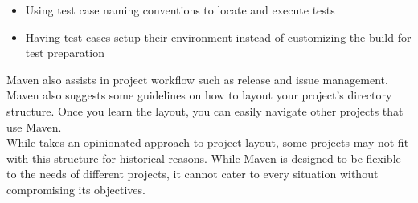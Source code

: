 \begin{itemize}
\begin{itemize}
\item Using test case naming conventions to locate and execute tests
\item Having test cases setup their environment instead of customizing the build for test preparation
\end{itemize}
Maven also assists in project workflow such as release and issue management.\\
Maven also suggests some guidelines on how to layout your project’s directory structure. Once you learn the layout, you can easily navigate other projects that use Maven.\\
While takes an opinionated approach to project layout, some projects may not fit with this structure for historical reasons. While Maven is designed to be flexible to the needs of different projects, it cannot cater to every situation without compromising its objectives.
\end{itemize}

%
